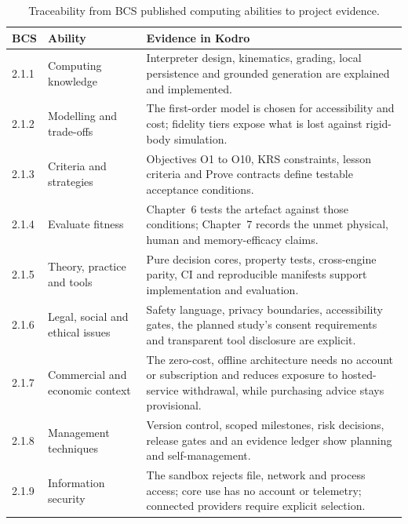 \documentclass[11pt,a4paper]{report}
\begin{document}
\begin{table}[h]
\centering\footnotesize
\renewcommand{\arraystretch}{1.12}
\begin{tabular}{p{1.4cm}p{4.8cm}p{8.2cm}}
\toprule
BCS & Ability & Evidence in Kodro \\
\midrule
2.1.1 & Computing knowledge & Interpreter design, kinematics, grading, local persistence and grounded generation are explained and implemented. \\
2.1.2 & Modelling and trade-offs & The first-order model is chosen for accessibility and cost; fidelity tiers expose what is lost against rigid-body simulation. \\
2.1.3 & Criteria and strategies & Objectives O1 to O10, KRS constraints, lesson criteria and Prove contracts define testable acceptance conditions. \\
2.1.4 & Evaluate fitness & Chapter~6 tests the artefact against those conditions; Chapter~7 records the unmet physical, human and memory-efficacy claims. \\
2.1.5 & Theory, practice and tools & Pure decision cores, property tests, cross-engine parity, CI and reproducible manifests support implementation and evaluation. \\
2.1.6 & Legal, social and ethical issues & Safety language, privacy boundaries, accessibility gates, the planned study's consent requirements and transparent tool disclosure are explicit. \\
2.1.7 & Commercial and economic context & The zero-cost, offline architecture needs no account or subscription and reduces exposure to hosted-service withdrawal, while purchasing advice stays provisional. \\
2.1.8 & Management techniques & Version control, scoped milestones, risk decisions, release gates and an evidence ledger show planning and self-management. \\
2.1.9 & Information security & The sandbox rejects file, network and process access; core use has no account or telemetry; connected providers require explicit selection. \\
\bottomrule
\end{tabular}
\caption{Traceability from BCS published computing abilities to project evidence.}
\label{tab:bcsmap}
\end{table}
\end{document}
